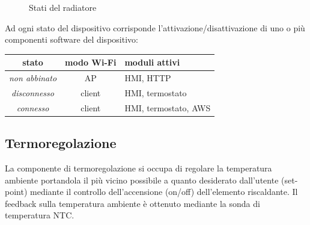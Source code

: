 \documentclass[12pt,a4paper,twoside,titlepage]{book}
\begin{document}
\begin{figure}[ht]
    \centering
    \caption{Stati del radiatore}
    \label{fig:stati}
\end{figure}

Ad ogni stato del dispositivo corrisponde l'attivazione/disattivazione di uno o più
componenti software del dispositivo:

\begin{center}
\begin{tabular}{| c | c | l |}
    \hline
    stato & modo Wi-Fi & moduli attivi \\
    \hline
    \textit{non abbinato} & AP & HMI, HTTP \\
    \hline
    \textit{disconnesso} & client & HMI, termostato \\
    \hline
    \textit{connesso} & client & HMI, termostato, AWS \\
    \hline
\end{tabular}
\end{center}

\subsection{Termoregolazione}

La componente di termoregolazione si occupa di regolare la temperatura ambiente portandola
il più vicino possibile a quanto desiderato dall'utente (set-point) mediante
il controllo dell'accensione (on/off) dell'elemento riscaldante. Il feedback sulla
temperatura ambiente è ottenuto mediante la sonda di temperatura NTC.
\end{document}
